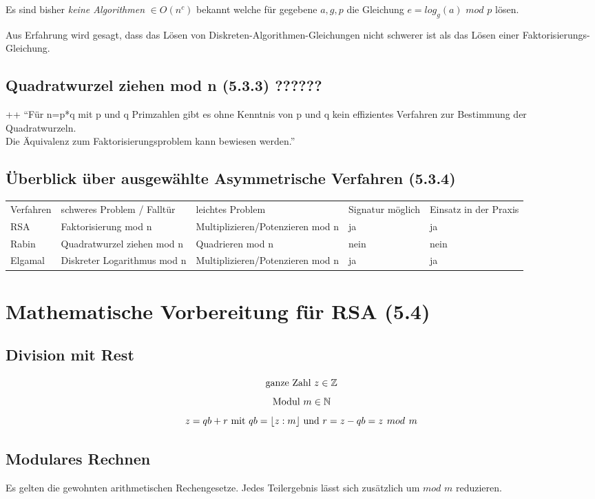 Es sind bisher \emph{keine Algorithmen} $\in O(n^c)$ bekannt welche für gegebene $a,g,p$ die Gleichung $e = log_g(a) \hspace{4pt} mod \hspace{4pt} p$ lösen.

Aus Erfahrung wird gesagt, dass das Lösen von Diskreten-Algorithmen-Gleichungen nicht schwerer ist als das Lösen einer Faktorisierungs-Gleichung.


\subsection{Quadratwurzel ziehen mod n (5.3.3) ??????}++
"`Für n=p*q mit p und q Primzahlen gibt es ohne Kenntnis von p und q kein effizientes Verfahren zur Bestimmung der Quadratwurzeln.\\
Die Äquivalenz zum Faktorisierungsproblem kann bewiesen werden."'

\subsection{Überblick über ausgewählte Asymmetrische Verfahren (5.3.4)}
\begin{tabular}{*{5}{l}}
Verfahren & schweres Problem / Falltür & leichtes Problem & Signatur möglich & Einsatz in der Praxis \\
RSA & Faktorisierung mod n & Multiplizieren/Potenzieren mod n & ja & ja \\
Rabin & Quadratwurzel ziehen mod n & Quadrieren mod n & nein & nein \\
Elgamal & Diskreter Logarithmus mod n & Multiplizieren/Potenzieren mod n & ja & ja \\
\end{tabular}

\section{Mathematische Vorbereitung für RSA (5.4)}
\subsection{Division mit Rest}
$$
\textnormal{ganze Zahl } z \in \mathbb{Z}
$$
$$
 \textnormal{Modul } m \in \mathbb{N}
$$
$$
z = qb + r \textnormal{ mit } qb = \lfloor z : m \rfloor \textnormal{ und } r = z - qb = z \hspace{4pt} mod \hspace{4pt} m 
$$

\subsection{Modulares Rechnen}
Es gelten die gewohnten arithmetischen Rechengesetze. Jedes Teilergebnis lässt sich zusätzlich um $ mod \hspace{4pt} m$ reduzieren.

